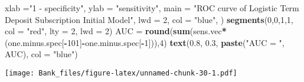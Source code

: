 \documentclass[
]{article}
\newenvironment{Shaded}{\begin{snugshade}}{\end{snugshade}}
\newcommand{\AttributeTok}[1]{\textcolor[rgb]{0.13,0.29,0.53}{#1}}
\newcommand{\DecValTok}[1]{\textcolor[rgb]{0.00,0.00,0.81}{#1}}
\newcommand{\FloatTok}[1]{\textcolor[rgb]{0.00,0.00,0.81}{#1}}
\newcommand{\FunctionTok}[1]{\textcolor[rgb]{0.13,0.29,0.53}{\textbf{#1}}}
\newcommand{\NormalTok}[1]{#1}
\newcommand{\OtherTok}[1]{\textcolor[rgb]{0.56,0.35,0.01}{#1}}
\newcommand{\SpecialCharTok}[1]{\textcolor[rgb]{0.81,0.36,0.00}{\textbf{#1}}}
\newcommand{\StringTok}[1]{\textcolor[rgb]{0.31,0.60,0.02}{#1}}
\begin{document}
\begin{Shaded}
\begin{Highlighting}[]
     \AttributeTok{xlab =}\StringTok{"1 {-} specificity"}\NormalTok{,}
     \AttributeTok{ylab =} \StringTok{"sensitivity"}\NormalTok{,}
     \AttributeTok{main =} \StringTok{"ROC curve of Logistic Term Deposit Subscription Initial Model"}\NormalTok{,}
     \AttributeTok{lwd =} \DecValTok{2}\NormalTok{,}
     \AttributeTok{col =} \StringTok{"blue"}\NormalTok{, )}
\FunctionTok{segments}\NormalTok{(}\DecValTok{0}\NormalTok{,}\DecValTok{0}\NormalTok{,}\DecValTok{1}\NormalTok{,}\DecValTok{1}\NormalTok{, }\AttributeTok{col =} \StringTok{"red"}\NormalTok{, }\AttributeTok{lty =} \DecValTok{2}\NormalTok{, }\AttributeTok{lwd =} \DecValTok{2}\NormalTok{)}
\NormalTok{AUC }\OtherTok{=} \FunctionTok{round}\NormalTok{(}\FunctionTok{sum}\NormalTok{(sens.vec}\SpecialCharTok{*}\NormalTok{(one.minus.spec[}\SpecialCharTok{{-}}\DecValTok{101}\NormalTok{]}\SpecialCharTok{{-}}\NormalTok{one.minus.spec[}\SpecialCharTok{{-}}\DecValTok{1}\NormalTok{])),}\DecValTok{4}\NormalTok{)}
\FunctionTok{text}\NormalTok{(}\FloatTok{0.8}\NormalTok{, }\FloatTok{0.3}\NormalTok{, }\FunctionTok{paste}\NormalTok{(}\StringTok{"AUC = "}\NormalTok{, AUC), }\AttributeTok{col =} \StringTok{"blue"}\NormalTok{)}
\end{Highlighting}
\end{Shaded}

\texttt{[image: Bank\_files/figure-latex/unnamed-chunk-30-1.pdf]}
\end{document}
